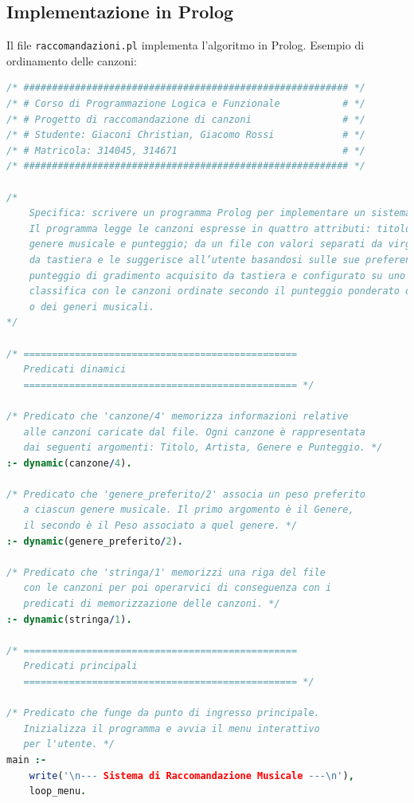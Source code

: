 \documentclass[a4paper,11pt]{article}
\begin{document}
\subsection{Implementazione in Prolog}
Il file \texttt{raccomandazioni.pl} implementa l'algoritmo in Prolog. Esempio di ordinamento delle canzoni:
\begin{lstlisting}[language=Prolog]
/* ######################################################### */
/* # Corso di Programmazione Logica e Funzionale           # */
/* # Progetto di raccomandazione di canzoni                # */
/* # Studente: Giaconi Christian, Giacomo Rossi            # */
/* # Matricola: 314045, 314671                             # */
/* ######################################################### */

/*
    Specifica: scrivere un programma Prolog per implementare un sistema di raccoandazione di canzoni.
    Il programma legge le canzoni espresse in quattro attributi: titolo, artista,
    genere musicale e punteggio; da un file con valori separati da virgole, il cui nome viene acquisito
    da tastiera e le suggerisce all’utente basandosi sulle sue preferenze musicali, utilizzando un
    punteggio di gradimento acquisito da tastiera e configurato su uno o più generi, per creare una
    classifica con le canzoni ordinate secondo il punteggio ponderato da quello di gradimento del
    o dei generi musicali.
*/

/* ================================================
   Predicati dinamici
   ================================================ */

/* Predicato che 'canzone/4' memorizza informazioni relative
   alle canzoni caricate dal file. Ogni canzone è rappresentata 
   dai seguenti argomenti: Titolo, Artista, Genere e Punteggio. */
:- dynamic(canzone/4).

/* Predicato che 'genere_preferito/2' associa un peso preferito
   a ciascun genere musicale. Il primo argomento è il Genere,
   il secondo è il Peso associato a quel genere. */
:- dynamic(genere_preferito/2).

/* Predicato che 'stringa/1' memorizzi una riga del file 
   con le canzoni per poi operarvici di conseguenza con i
   predicati di memorizzazione delle canzoni. */
:- dynamic(stringa/1).

/* ================================================
   Predicati principali
   ================================================ */

/* Predicato che funge da punto di ingresso principale.
   Inizializza il programma e avvia il menu interattivo
   per l'utente. */
main :-
    write('\n--- Sistema di Raccomandazione Musicale ---\n'),
    loop_menu.


\end{lstlisting}
\end{document}
